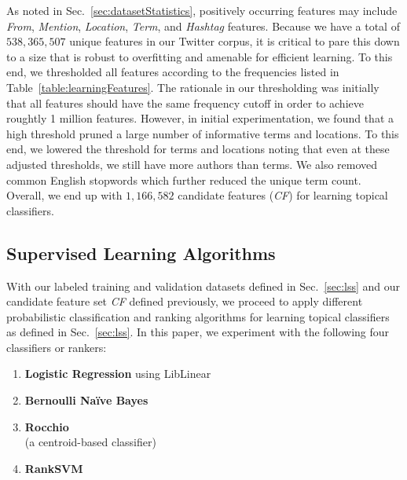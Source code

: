 \documentclass[letterpaper]{article}
\begin{document}
As noted in Sec.~\ref{sec:datasetStatistics}, positively occurring
features %
may include
\textit{From}, \textit{Mention}, \textit{Location}, \textit{Term}, and \textit{Hashtag} features.
Because we have a total of $538,365,507$ unique features in our
Twitter corpus, it is critical to pare this down to a size that is robust to overfitting
and amenable for efficient learning.  To this end, we
thresholded all features according to the frequencies listed in
Table~\ref{table:learningFeatures}.  The rationale in our thresholding
was initially that all features should have the same frequency cutoff
in order to achieve roughtly 1 million features.  However, in 
initial experimentation, we found that a high threshold pruned a large
number of informative terms and locations.  To this end, we lowered
the threshold for terms and locations noting that even at these
adjusted thresholds, we still have more authors than terms.  We
also removed common English stopwords which further reduced the
unique term count.  Overall, we end up with $1,166,582$
candidate features (\textit{CF}) for learning topical classifiers.

\subsection{Supervised Learning Algorithms}

With our labeled training and validation datasets defined in
Sec.~\ref{sec:lss} and our candidate feature set \textit{CF} defined
previously, we proceed to apply different probabilistic classification and ranking
algorithms %
for learning topical classifiers as defined in Sec.~\ref{sec:lss}.  
In this paper, we experiment with
the following four classifiers or rankers:%
\begin{enumerate}%
\item {\bf Logistic Regression} using LibLinear~\cite{liblinear}
\item {\bf Bernoulli Na\"{i}ve Bayes}~\cite{mccallum98nb}
\item {\bf Rocchio}~\cite{manning_ir}\\(a centroid-based classifier)
\item {\bf RankSVM}~\cite{rsvm}
\end{enumerate}
\end{document}
